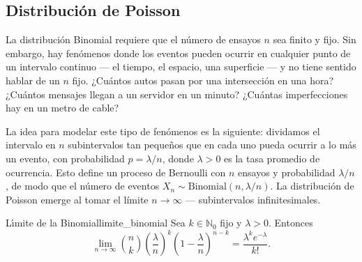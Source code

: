 \documentclass[12pt, a4paper]{book}
\numberwithin{equation}{chapter}
\begin{document}
\subsection{Distribuci\'{o}n de Poisson}

La distribución Binomial requiere que el número de ensayos $n$ sea
finito y fijo. Sin embargo, hay fenómenos donde los eventos pueden
ocurrir en cualquier punto de un intervalo continuo --- el tiempo, el
espacio, una superficie --- y no tiene sentido hablar de un $n$ fijo.
¿Cuántos autos pasan por una intersección en una hora? ¿Cuántos
mensajes llegan a un servidor en un minuto? ¿Cuántas imperfecciones
hay en un metro de cable?

La idea para modelar este tipo de fenómenos es la siguiente: dividamos
el intervalo en $n$ subintervalos tan pequeños que en cada uno pueda
ocurrir a lo más un evento, con probabilidad $p = \lambda/n$, donde
$\lambda > 0$ es la tasa promedio de ocurrencia. Esto define un proceso
de Bernoulli con $n$ ensayos y probabilidad $\lambda/n$, de modo que
el número de eventos $X_n \sim \mathrm{Binomial}(n, \lambda/n)$. La
distribución de Poisson emerge al tomar el límite $n \to \infty$ ---
subintervalos infinitesimales.

\begin{proposicion}{L\'{\i}mite de la Binomial}{limite_binomial}
	Sea $k \in \mathbb{N}_0$ fijo y $\lambda > 0$. Entonces
	\[
	\lim_{n\to\infty}
	\binom{n}{k}
	\left(\frac{\lambda}{n}\right)^k
	\left(1-\frac{\lambda}{n}\right)^{n-k}
	= \frac{\lambda^k e^{-\lambda}}{k!}.
	\]
\end{proposicion}
\end{document}
